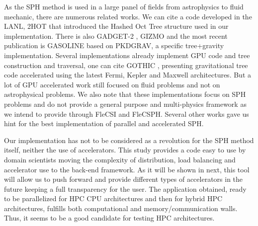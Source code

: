 As the SPH method is used in a large panel of fields from astrophysics to fluid mechanic, there are numerous related works. 
We can cite a code developed in the LANL, 2HOT \cite{warren20132hot} that introduced the Hashed Oct Tree structure used in our implementation. 
There is also GADGET-2 \cite{springel2005cosmological}, GIZMO \cite{hopkins2014gizmo} and the most recent publication is GASOLINE \cite{wadsley2017gasoline2} based on PKDGRAV, a specific tree+gravity implementation. 
Several implementations already implement GPU code and tree construction and traversal, one can cite GOTHIC \cite{miki2017gothic}, presenting gravitational tree code accelerated using the latest Fermi, Kepler and Maxwell architectures. 
But a lot of GPU accelerated work still focused on fluid problems and not on astrophysical problems\cite{harada2007smoothed,crespo2011gpus}.
We also note that these implementations focus on SPH problems and do not provide a general purpose and multi-physics framework as we intend to provide through FleCSI and FleCSPH. 
Several other works gave us hint for the best implementation of parallel and accelerated SPH\cite{ihmsen2011parallel,ihmsen2014sph}.

Our implementation has not to be considered as a revolution for the SPH method itself, neither the use of accelerators. 
This study provides a code easy to use by domain scientists moving the complexity of distribution, load balancing and accelerator use to the back-end framework.
As it will be shown in next, this tool will allow us to push forward and provide different types of accelerators in the future keeping a full transparency for the user.
The application obtained, ready to be parallelized for HPC CPU architectures and then for hybrid HPC architectures, fulfills both computational and memory/communication walls. 
Thus, it seems to be a good candidate for testing HPC architectures.
